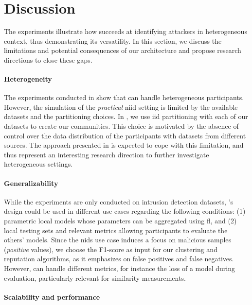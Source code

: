 \section{Discussion\label{sec:radar.discussion}}

The experiments illustrate how \thecontrib succeeds at identifying attackers in heterogeneous context, thus demonstrating its versatility.
In this section, we discuss the limitations and potential consequences of our architecture and propose research directions to close these gaps. 


\paragraph{Heterogeneity}

The experiments conducted in  show that \thecontrib can handle heterogeneous participants.
However, the simulation of the \emph{practical} \gls{niid} setting is limited by the available datasets and the partitioning choices.
In \thecontrib, we use \gls{iid} partitioning with each of our datasets to create our communities.
This choice is motivated by the absence of control over the data distribution of the participants with datasets from different sources.
The approach presented in  is expected to cope with this limitation, and thus represent an interesting research direction to further investigate heterogeneous settings.


\paragraph{Generalizability}

While the experiments are only conducted on intrusion detection datasets, \thecontrib's design could be used in different use cases regarding the following conditions: (1) parametric local models whose parameters can be aggregated using \gls{fl}, and (2) local testing sets and relevant metrics allowing participants to evaluate the others’ models.
Since the \gls{nids} use case induces a focus on malicious samples (\ie \emph{positive} values), we choose the F1-score as input for our clustering and reputation algorithms, as it emphasizes on false positives and false negatives.
However, \thecontrib can handle different metrics, for instance the loss of a model during evaluation, particularly relevant for similarity measurements.


\paragraph{Scalability and performance}

